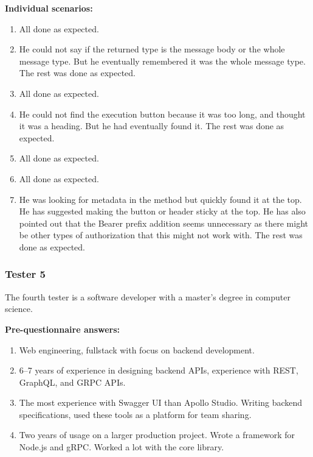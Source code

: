 \textbf{Individual scenarios:}
\begin{enumerate}
    \item All done as expected.
    \item He could not say if the returned type is the message body or the whole message type.
    But he eventually remembered it was the whole message type.
    The rest was done as expected.
    \item All done as expected.
    \item He could not find the execution button because it was too long, and thought it was a heading.
    But he had eventually found it.
    The rest was done as expected.
    \item All done as expected.
    \item All done as expected.
    \item He was looking for metadata in the method but quickly found it at the top.
    He has suggested making the button or header sticky at the top.
    He has also pointed out that the Bearer prefix addition seems unnecessary as there might be other types of authorization that this might not work with.
    The rest was done as expected.
\end{enumerate}

\subsubsection{Tester 5}
The fourth tester is a software developer with a master's degree in computer science.

\textbf{Pre-questionnaire answers:}
\begin{enumerate}
    \item Web engineering, fullstack with focus on backend development.
    \item 6--7 years of experience in designing backend APIs, experience with REST, GraphQL, and GRPC APIs.
    \item The most experience with Swagger UI than Apollo Studio.
    Writing backend specifications, used these tools as a platform for team sharing.
    \item Two years of usage on a larger production project.
    Wrote a framework for Node.js and gRPC\@.
    Worked a lot with the core library.
\end{enumerate}

